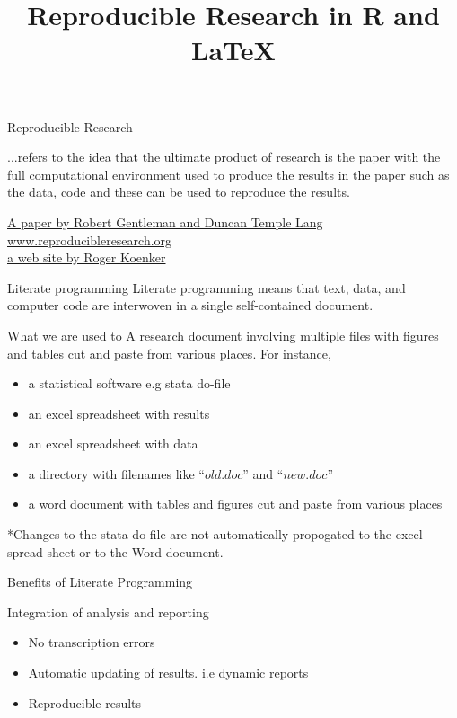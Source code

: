 \documentclass[xcolor=dvipsnames]{beamer}
\begin{document}


\title{\textbf{Reproducible Research in R and \LaTeX}}

\titlepage{}

\begin{frame}{Reproducible Research}

...refers to the idea that the ultimate product of research is the paper with the full computational environment used to produce the results in the paper such as the data, code and these can be used to reproduce the results.

\vspace{7 mm}
\href{www.bepress.com/bioconductor/paper2/}{A paper by Robert Gentleman and Duncan Temple Lang}
\url{www.reproducibleresearch.org}\\
\href{www.econ.uiuc.edu/~roger/repro.html}{a web site by Roger Koenker}

\end{frame}

\begin{frame}{Literate programming}
Literate programming means that text, data, and computer code
are interwoven in a single self-contained document.

\end{frame}

\begin{frame}{What we are used to}
A research document involving multiple files with figures and tables
cut and paste from various places. For instance,

\begin{itemize}
\item a statistical software e.g stata do-file 
\item an excel spreadsheet with results
\item an excel spreadsheet with data
\item a directory with filenames like $“old.doc”$ and $“new.doc”$
\item a word document with tables and figures cut and paste from
various places
\end{itemize}

*Changes to the stata do-file are not automatically propogated to
the excel spread-sheet or to the Word document.

\end{frame}

\begin{frame}{Benefits of Literate Programming}

Integration of analysis and reporting
\begin{itemize}
\item No transcription errors
\item Automatic updating of results. i.e dynamic reports
\item Reproducible results

\end{itemize}

\end{frame}
\end{document}
